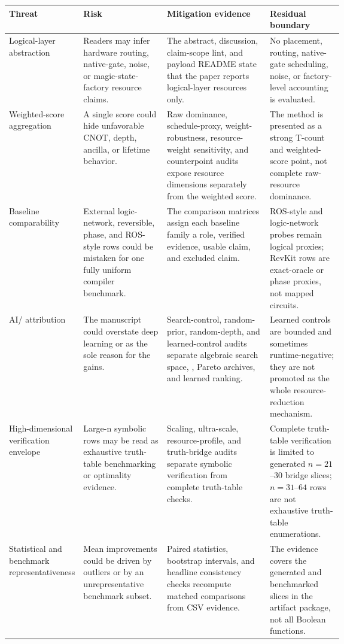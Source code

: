 \begin{tabularx}{\linewidth}{>{\raggedright\arraybackslash}p{0.18\linewidth}>{\raggedright\arraybackslash}p{0.25\linewidth}>{\raggedright\arraybackslash}X>{\raggedright\arraybackslash}p{0.22\linewidth}}
\toprule
Threat & Risk & Mitigation evidence & Residual boundary \\
\midrule
Logical-layer abstraction & Readers may infer hardware routing, native-gate, noise, or magic-state-factory resource claims. & The abstract, discussion, claim-scope lint, and payload README state that the paper reports logical-layer resources only. & No placement, routing, native-gate scheduling, noise, or factory-level accounting is evaluated. \\
Weighted-score aggregation & A single score could hide unfavorable CNOT, depth, ancilla, or lifetime behavior. & Raw dominance, schedule-proxy, weight-robustness, resource-weight sensitivity, and counterpoint audits expose resource dimensions separately from the weighted score. & The method is presented as a strong T-count and weighted-score point, not complete raw-resource dominance. \\
Baseline comparability & External logic-network, reversible, phase, and ROS-style rows could be mistaken for one fully uniform compiler benchmark. & The comparison matrices assign each baseline family a role, verified evidence, usable claim, and excluded claim. & ROS-style and logic-network probes remain logical proxies; RevKit rows are exact-oracle or phase proxies, not mapped circuits. \\
AI/\mcts{} attribution & The manuscript could overstate deep learning or \mcts{} as the sole reason for the gains. & Search-control, random-prior, random-depth, and learned-control audits separate algebraic search space, \mcts{}, Pareto archives, and learned ranking. & Learned controls are bounded and sometimes runtime-negative; they are not promoted as the whole resource-reduction mechanism. \\
High-dimensional verification envelope & Large-n symbolic rows may be read as exhaustive truth-table benchmarking or optimality evidence. & Scaling, ultra-scale, resource-profile, and truth-bridge audits separate symbolic verification from complete truth-table checks. & Complete truth-table verification is limited to generated $n=21$--$30$ bridge slices; $n=31$--$64$ rows are not exhaustive truth-table enumerations. \\
Statistical and benchmark representativeness & Mean improvements could be driven by outliers or by an unrepresentative benchmark subset. & Paired statistics, bootstrap intervals, and headline consistency checks recompute matched comparisons from CSV evidence. & The evidence covers the generated and benchmarked slices in the artifact package, not all Boolean functions. \\

\end{tabularx}

